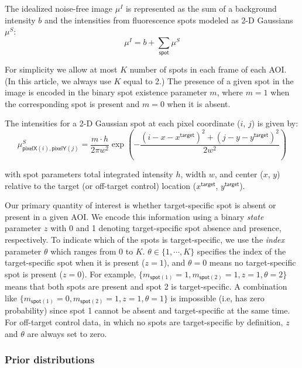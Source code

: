 The idealized noise-free image $\mu^I$ is represented  as the sum of a background intensity $b$ and the intensities from fluorescence spots modeled as  2-D Gaussians $\mu^S$:
%
\begin{equation}
    \mu^I = b + \sum_{\mathsf{spot}} \mu^S
\end{equation}

\noindent
For simplicity we allow at most $K$ number of spots in each frame of each AOI.  (In this article, we always use $K$ equal to 2.)  The presence of a given spot in the image is encoded in the binary spot existence parameter $m$, where $m = 1$ when the corresponding spot is present and $m = 0$ when it is absent.

The intensities for a 2-D Gaussian spot at each pixel coordinate ($i$, $j$) is given by:
%
\begin{equation}
    \mu^S_{\mathsf{pixelX}(i), \mathsf{pixelY}(j)} = \dfrac{m \cdot h}{2 \pi w^2} \exp{\left( -\dfrac{(i-x-x^\mathsf{target})^2 + (j-y-y^\mathsf{target})^2}{2 w^2} \right)}
\end{equation}

\noindent
with spot parameters total integrated intensity $h$, width $w$, and center ($x$, $y$) relative to the target (or off-target control) location ($x^\mathsf{target}$, $y^\mathsf{target}$). 
%

Our primary quantity of interest is whether target-specific spot is absent or present in a given AOI. We encode this information using a binary \emph{state} parameter $z$ with 0 and 1 denoting target-specific spot absence and presence, respectively. To indicate which of the spots is target-specific, we use the \emph{index} parameter $\theta$ which ranges from $0$ to $K$. $\theta \in \{1, \cdots, K \}$ specifies the index of the target-specific spot when it is present ($z = 1$), and $\theta = 0$ means no target-specific spot is present ($z = 0$). For example, $\{ m_{\mathsf{spot}(1)}=1, m_{\mathsf{spot}(2)}=1, z = 1, \theta=2 \}$ means that both spots are present and spot 2 is target-specific. A combination like $\{ m_{\mathsf{spot}(1)}=0, m_{\mathsf{spot}(2)}=1, z = 1, \theta=1 \}$ is impossible (i.e, has zero probability) since spot 1 cannot be absent and target-specific at the same time. For off-target control data, in which no spots are target-specific by definition, $z$ and $\theta$ are always set to zero.
%

\subsubsection{Prior distributions}

